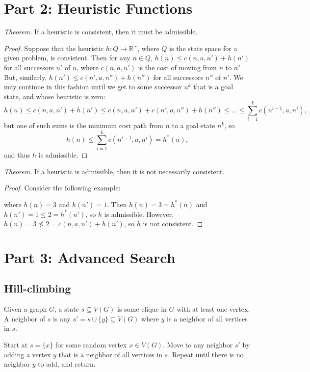 \documentclass[11pt]{amsart}
\begin{document}
\section*{Part 2: Heuristic Functions}

\emph{Theorem.}
If a heuristic is consistent, then it must be admissible.

\begin{proof}
Suppose that the heuristic $h: Q \rightarrow \mathbb{R}^+$, where $Q$ is the state space for a given
problem, is consistent.  Then for any $n \in Q$, $h(n) \leq c(n, a, n') + h(n')$ for all successors
$n'$ of $n$, where $c(n, a, n')$ is the cost of moving from $n$ to $n'$.  But, similarly, $h(n') \leq
c(n', a, n'') + h(n'')$ for all successors $n''$ of $n'$.  We may continue in this fashion until we
get to some successor $n^k$ that is a goal state, and whose heuristic is zero:
\[
h(n) \leq c(n, a, n') + h(n') \leq c(n, a, n') + c(n', a, n'') + h(n'') \leq \dots \leq
\sum_{i = 1}^k c(n^{i-1}, a, n^i),
\]
but one of such sums is the minimum cost path from $n$ to a goal state $n^k$, so
\[
h(n) \leq \sum_{i = 1}^k c(n^{i-1}, a, n^i) = h^*(n),
\]
and thus $h$ is admissible.
\end{proof}

\emph{Theorem.}
If a heuristic is admissible, then it is not necessarily consistent.

\begin{proof}
Consider the following example:

\vspace*{1in}

where $h(n) = 3$ and $h(n') = 1$.  Then $h(n) = 3 = h^*(n)$ and $h(n') = 1 \leq 2 = h^*(n')$,
so $h$ is admissible.  However, $h(n) = 3 \nleq 2 = c(n, a, n') + h(n')$, so $h$ is not consistent.
\end{proof}

\section*{Part 3: Advanced Search}

\subsection*{Hill-climbing}  Given a graph $G$, a state $s \subseteq V(G)$ is some clique in $G$
with at least one vertex.  A neighbor of $s$ is any $s' = s \cup \{y\} \subseteq V(G)$ where $y$ is a
neighbor of all vertices in $s$.

Start at $s = \{x\}$ for some random vertex $x \in V(G)$.  Move to any neighbor $s'$ by adding a
vertex $y$ that is a neighbor of all vertices in $s$.  Repeat until there is no neighbor $y$ to add,
and return.
\end{document}

